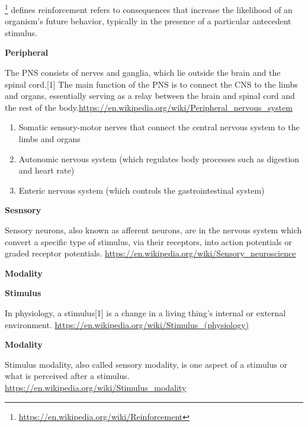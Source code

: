 \documentclass{book}
\providecommand{\ProjectDeepHeading}[2]{%
    \par\medskip\noindent\textbf{#2}\par\smallskip
}
\providecommand{\clickurlfooter}[1]{\footnote{\url{#1}}}
\begin{document}
\clickurlfooter{https://en.wikipedia.org/wiki/Reinforcement} defines reinforcement refers to consequences that increase the likelihood of an organism's future behavior, typically in the presence of a particular antecedent stimulus.

\ProjectDeepHeading{1}{Peripheral}


The PNS consists of nerves and ganglia, which lie outside the brain and the spinal cord.[1] The main function of the PNS is to connect the CNS to the limbs and organs, essentially serving as a relay between the brain and spinal cord and the rest of the body.\url{https://en.wikipedia.org/wiki/Peripheral_nervous_system}
    \begin{enumerate}
        \item Somatic sensory-motor nerves that connect the central nervous system to the limbs and organs
        \item Autonomic nervous system (which regulates body processes such as digestion and heart rate)
        \item Enteric nervous system (which controls the gastrointestinal system)
    \end{enumerate}

\ProjectDeepHeading{1}{Sesnsory}


Sensory neurons, also known as afferent neurons, are in the nervous system which convert a specific type of stimulus, via their receptors, into action potentials or graded receptor potentials.
    \url{https://en.wikipedia.org/wiki/Sensory_neuroscience}

\ProjectDeepHeading{2}{Modality}

\ProjectDeepHeading{3}{Stimulus}


In physiology, a stimulus[1] is a change in a living thing's internal or external environment.
    \url{https://en.wikipedia.org/wiki/Stimulus_(physiology)}

\ProjectDeepHeading{4}{Modality}


Stimulus modality, also called sensory modality, is one aspect of a stimulus or what is perceived after a stimulus.
    \url{https://en.wikipedia.org/wiki/Stimulus_modality}
\end{document}
